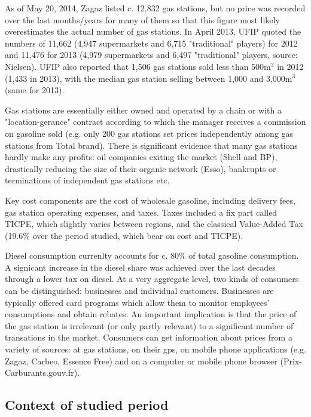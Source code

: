 \documentclass[english]{article}
\begin{document}
As of May 20, 2014, Zagaz listed c. 12,832 gas stations, but no price was recorded over the last months/years for many of them so that this figure most likely overestimates the actual number of gas stations. In April 2013, UFIP quoted the numbers of 11,662 (4,947 supermarkets and 6,715 "traditional" players) for 2012 and 11,476 for 2013 (4,979 supermarkets and 6,497 "traditional" players, source: Nielsen). UFIP also reported that 1,506 gas stations sold less than 500m$^{3}$ in 2012 (1,433 in 2013), with the median gas station selling between 1,000 and 3,000m$^{3}$ (same for 2013).

Gas stations are essentially either owned and operated by a chain or with a "location-gerance" contract according to which the manager receives a commission on gasoline sold (e.g. only 200 gas stations set prices independently among gas stations from Total brand). There is significant evidence that many gas stations hardly make any profits: oil companies exiting the market (Shell and BP), drastically reducing the size of their organic network (Esso), bankrupts or terminations of independent gas stations etc.

Key cost components are the cost of wholesale gasoline, including delivery fees,  gas station operating expenses, and taxes. Taxes included a fix part called TICPE, which slightly varies between regions, and the classical Value-Added Tax (19.6\% over the period studied, which bear on cost and TICPE).

Diesel consumption currenlty accounts for c. 80\% of total gasoline consumption. A signicant increase in the diesel share was achieved over the last decades through a lower tax on diesel. At a very aggregate level, two kinds of consumers can be distinguished: businesses and individual customers. Businesses are typically offered card programs which allow them to monitor employees' consumptions and obtain rebates. An important implication is that the price of the gas station is irrelevant (or only partly relevant) to a significant number of transations in the market.
Consumers can get information about prices from a variety of sources: at gas stations, on their gps, on mobile phone applications (e.g. Zagaz, Carbeo, Essence Free) and on a computer or mobile phone browser (Prix-Carburants.gouv.fr).

\subsection{Context of studied period}
\end{document}
